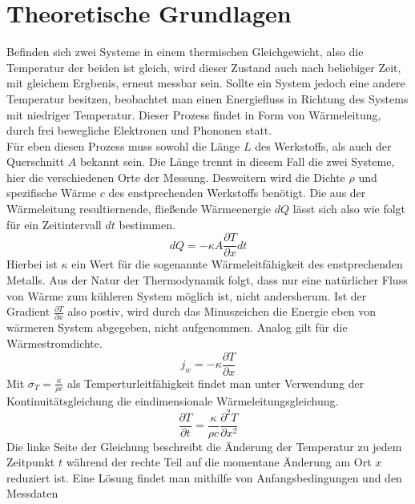 \section{Theoretische Grundlagen}
Befinden sich zwei Systeme in einem thermischen Gleichgewicht, also die Temperatur der beiden ist gleich, 
wird dieser Zustand auch nach beliebiger Zeit, mit gleichem Ergbenis, erneut messbar sein. Sollte ein System jedoch eine andere Temperatur besitzen, beobachtet 
man einen Energiefluss in Richtung des Systems mit niedriger Temperatur. Dieser Prozess findet in Form von Wärmeleitung, durch frei bewegliche Elektronen und Phononen statt.
\\
\newline
Für eben diesen Prozess muss sowohl die Länge $L$ des Werkstoffs, als auch der Querschnitt $A$ bekannt sein. Die Länge trennt in diesem Fall die zwei Systeme,
hier die verschiedenen Orte der Messung. Desweitern wird die Dichte $\rho$ und spezifische Wärme $c$ des enstprechenden Werkstoffs benötigt.
Die aus der Wärmeleitung resultiernende, fließende Wärmeenergie $dQ$ lässt sich also wie folgt für ein Zeitintervall $dt$ bestimmen.
\begin{equation}
    \label{eqn:itsHeadacheTimeYeeeay}
    dQ = -\kappa A \frac{\partial T}{\partial x} dt 
\end{equation}
Hierbei ist $\kappa$ ein Wert für die sogenannte Wärmeleitfähigkeit des enstprechenden Metalls. Aus der Natur der Thermodynamik 
folgt, dass nur eine natürlicher Fluss von Wärme zum kühleren System möglich ist, nicht andersherum. Ist der Gradient $\frac{\partial T}{\partial x}$ also postiv, 
wird durch das Minuszeichen die Energie eben von wärmeren System abgegeben, nicht aufgenommen.
Analog gilt für die Wärmestromdichte.
\begin{equation}
    \label{eqn:stromdichte}
    j_w = -\kappa \frac{\partial T}{\partial x}
\end{equation}
Mit $ \sigma_T = \frac{\kappa}{\rho c}$ als Temperturleitfähigkeit findet man unter Verwendung der Kontinuitätsgleichung die eindimensionale Wärmeleitungsgleichung.
\begin{equation}
    \label{eqn:1dim}
    \frac{\partial T}{\partial t} = \frac{\kappa}{\rho c} \frac{\partial^2 T}{\partial x^2}
\end{equation}
Die linke Seite der Gleichung beschreibt die Änderung der Temperatur zu jedem Zeitpunkt $t$ während der rechte Teil 
auf die momentane Änderung am Ort $x$ reduziert ist. Eine Lösung findet man mithilfe von Anfangsbedingungen und den Messdaten 
